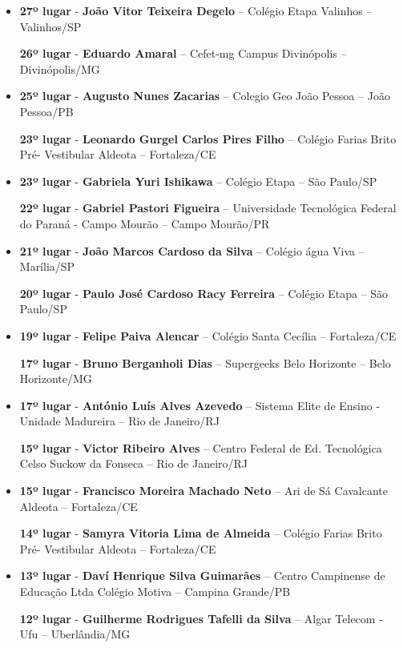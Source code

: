 \documentclass{article}
\begin{document}
\begin{itemize}
\item
\textbf{27º lugar} - \textbf{João Vitor Teixeira Degelo} – Colégio Etapa Valinhos – Valinhos/SP

\textbf{26º lugar} - \textbf{Eduardo Amaral} – Cefet-mg Campus Divinópolis – Divinópolis/MG



\item
\textbf{25º lugar} - \textbf{Augusto Nunes Zacarias} – Colegio Geo João Pessoa – João Pessoa/PB


\textbf{23º lugar} - \textbf{Leonardo Gurgel Carlos Pires Filho} – Colégio Farias Brito Pré- Vestibular Aldeota – Fortaleza/CE



\item
\textbf{23º lugar} - \textbf{Gabriela Yuri Ishikawa} – Colégio Etapa – São Paulo/SP


\textbf{22º lugar} - \textbf{Gabriel Pastori Figueira} – Universidade Tecnológica Federal do Paraná - Campo Mourão – Campo Mourão/PR



\item
\textbf{21º lugar} - \textbf{João Marcos Cardoso da Silva} – Colégio água Viva – Marília/SP


\textbf{20º lugar} - \textbf{Paulo José Cardoso Racy Ferreira} – Colégio Etapa – São Paulo/SP



\item
\textbf{19º lugar} - \textbf{Felipe Paiva Alencar} – Colégio Santa Cecília – Fortaleza/CE


\textbf{17º lugar} - \textbf{Bruno Berganholi Dias} – Supergeeks Belo Horizonte – Belo Horizonte/MG



\item
\textbf{17º lugar} - \textbf{António Luís Alves Azevedo} – Sistema Elite de Ensino - Unidade Madureira – Rio de Janeiro/RJ


\textbf{15º lugar} - \textbf{Victor Ribeiro Alves} – Centro Federal de Ed. Tecnológica Celso Suckow da Fonseca – Rio de Janeiro/RJ



\item
\textbf{15º lugar} - \textbf{Francisco Moreira Machado Neto} – Ari de Sá Cavalcante Aldeota – Fortaleza/CE


\textbf{14º lugar} - \textbf{Samyra Vitoria Lima de Almeida} – Colégio Farias Brito Pré- Vestibular Aldeota – Fortaleza/CE



\item
\textbf{13º lugar} - \textbf{Daví Henrique Silva Guimarães} – Centro Campinense de Educação Ltda Colégio Motiva – Campina Grande/PB


\textbf{12º lugar} - \textbf{Guilherme Rodrigues Tafelli da Silva} – Algar Telecom - Ufu – Uberlândia/MG



\end{itemize}
\end{document}
